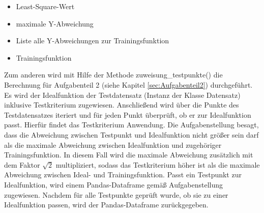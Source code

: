 \documentclass[11pt,a4paper]{scrreprt}
\begin{document}
\begin{itemize}
\item Least-Square-Wert
\item maximale Y-Abweichung
\item Liste alle Y-Abweichungen zur Trainingsfunktion
\item Trainingsfunktion  
\end{itemize}
Zum anderen wird mit Hilfe der Methode zuweisung\_testpunkte() die Berechnung für Aufgabenteil 2 (siehe Kapitel \ref{sec:Aufgabenteil2}) durchgeführt. Es wird der Idealfunktion der Testdatensatz (Instanz der Klasse Datensatz) inklusive Testkriterium zugewiesen. Anschließend wird über die Punkte des Testdatensatzes iteriert und für jeden Punkt überprüft, ob er zur Idealfunktion passt. Hierfür findet das Testkriterium Anwendung. Die Aufgabenstellung besagt, dass die Abweichung zwischen Testpunkt und Idealfunktion nicht größer sein darf als die maximale Abweichung zwischen Idealfunktion und zugehöriger Trainingsfunktion. In diesem Fall wird die maximale Abweichung zusätzlich mit dem Faktor $\sqrt{2}$ multipliziert, sodass das Testkriterium höher ist als die maximale Abweichung zwischen Ideal- und Trainingsfunktion. Passt ein Testpunkt zur Idealfunktion, wird einem Pandas-Dataframe gemäß Aufgabenstellung zugewiesen. Nachdem für alle Testpunkte geprüft wurde, ob sie zu einer Idealfunktion passen, wird der Pandas-Dataframe zurückgegeben. 
\end{document}

